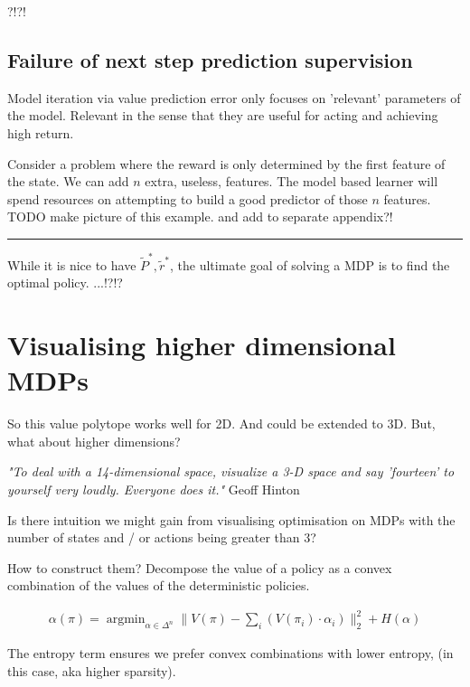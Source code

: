 ?!?!

\subsection{Failure of next step prediction supervision}

Model iteration via value prediction error only focuses on 'relevant' parameters of the model.
Relevant in the sense that they are useful for acting and achieving high return.

Consider a problem where the reward is only determined by the first feature of the state. We can add $n$ extra, useless, features.
The model based learner will spend resources on attempting to build a good predictor of those $n$ features.
{\color{red} TODO make picture of this example. and add to separate appendix?!}


\begin{center}\rule{0.5\linewidth}{\linethickness}\end{center}

While it is nice to have $\tilde P^{* }, \tilde r^{* }$, the ultimate goal of
solving a MDP is to find the optimal policy. ...!?!?

\newpage
\section{Visualising higher dimensional MDPs}\label{graph-vis}

So this value polytope works well for 2D. And could be extended to 3D. But, what about higher dimensions?

\begin{displayquote}
  \textit{"To deal with a 14-dimensional space, visualize a 3-D space and say 'fourteen' to yourself very loudly. Everyone does it."} Geoff Hinton
\end{displayquote}

Is there intuition we might gain from visualising optimisation on MDPs with the
number of states and / or actions being greater than 3?

How to construct them? Decompose the value of a policy as a convex combination
of the values of the deterministic policies.

\begin{align*}
  \alpha(\pi) = \mathop{\text{argmin}}_{\alpha \in \Delta^n} \parallel  V(\pi) - \sum_i (V(\pi_i) \cdot \alpha_i ) \parallel_2^2 + H(\alpha)
\end{align*}

The entropy term ensures we prefer convex combinations with lower entropy, (in this case, aka higher sparsity).

